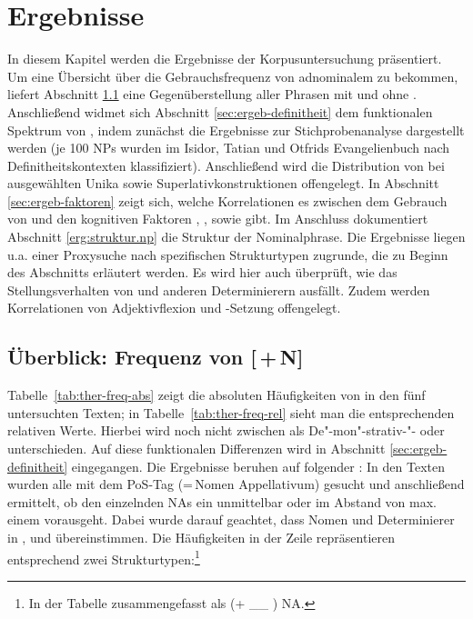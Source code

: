 \chapter{Ergebnisse}\label{ergebnisse}

In diesem Kapitel werden die Ergebnisse der Korpusuntersuchung  präsentiert. Um eine Übersicht über die Gebrauchsfrequenz von adnominalem  zu bekommen, liefert Abschnitt \ref{sec:ergeb-ther-freq} eine Gegenüberstellung aller Phrasen mit und ohne . Anschließend widmet sich Abschnitt \ref{sec:ergeb-definitheit} dem funktionalen Spektrum von , indem zunächst die Ergebnisse zur Stichprobenanalyse dargestellt werden (je 100 NPs wurden im Isidor, Tatian und Otfrids Evangelienbuch nach Definitheitskontexten  klassifiziert). Anschließend wird die Distribution von  bei ausgewählten Unika  sowie Superlativkonstruktionen  offengelegt. In Abschnitt \ref{sec:ergeb-faktoren} zeigt sich, welche Korrelationen es zwischen dem Gebrauch von  und den kognitiven Faktoren , ,  sowie  gibt. 
Im Anschluss dokumentiert Abschnitt \ref{erg:struktur.np} die Struktur der  Nominalphrase. Die Ergebnisse liegen u.a. einer Proxysuche  nach spezifischen Strukturtypen zugrunde, die zu Beginn des Abschnitts erläutert werden. Es wird hier auch überprüft, wie das Stellungsverhalten  von  und anderen Determinierern  ausfällt. Zudem werden Korrelationen von Adjektivflexion   und -Setzung offengelegt. 

\section{Überblick: Frequenz von [\,+\,N]}\label{sec:ergeb-ther-freq}\largerpage

Tabelle~\ref{tab:ther-freq-abs} zeigt die absoluten Häufigkeiten von  in den fünf untersuchten Texten; in Tabelle~\ref{tab:ther-freq-rel} sieht man die entsprechenden relativen Werte. Hierbei wird noch nicht zwischen  als De"-mon"-strativ-"-  oder  unterschieden. Auf diese funktionalen Differenzen wird in Abschnitt \ref{sec:ergeb-definitheit} eingegangen. Die Ergebnisse beruhen auf folgender : In den Texten wurden alle  mit dem PoS-Tag  (=\,Nomen  Appellativum) gesucht und anschließend ermittelt, ob den einzelnden NAs ein   unmittelbar oder im  Abstand von max. einem  vorausgeht. Dabei wurde darauf geachtet, dass Nomen und Determinierer  in ,  und  übereinstimmen. Die Häufigkeiten in der Zeile  repräsentieren entsprechend zwei Strukturtypen:\footnote{In der Tabelle zusammengefasst als  (+ \_\_ ) NA.}  

